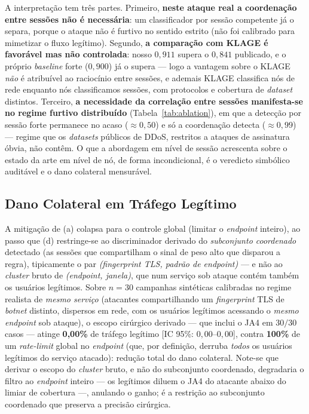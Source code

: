 \documentclass[preprint,12pt]{elsarticle}
\begin{document}
A interpretação tem três partes. Primeiro, \textbf{neste ataque real a coordenação entre sessões não é necessária}: um classificador por sessão competente já o separa, porque o ataque não é furtivo no sentido estrito (não foi calibrado para mimetizar o fluxo legítimo). Segundo, \textbf{a comparação com KLAGE é favorável mas não controlada}: nosso $0{,}911$ supera o $0{,}841$ publicado, e o próprio \emph{baseline} forte ($0{,}900$) já o supera --- logo a vantagem sobre o KLAGE \emph{não} é atribuível ao raciocínio entre sessões, e ademais KLAGE classifica nós de rede enquanto nós classificamos sessões, com protocolos e cobertura de \emph{dataset} distintos. Terceiro, \textbf{a necessidade da correlação entre sessões manifesta-se no regime furtivo distribuído} (Tabela~\ref{tab:ablation}), em que a detecção por sessão forte permanece no acaso ($\approx 0{,}50$) e só a coordenação detecta ($\approx 0{,}99$) --- regime que os \emph{datasets} públicos de DDoS, restritos a ataques de assinatura óbvia, não contêm. O que a abordagem em nível de sessão acrescenta sobre o estado da arte em nível de nó, de forma incondicional, é o veredicto simbólico auditável e o dano colateral mensurável.

\subsection{Dano Colateral em Tráfego Legítimo}

A mitigação de (a) colapsa para o controle global (limitar o \emph{endpoint} inteiro), ao passo que (d) restringe-se ao discriminador derivado do \emph{subconjunto coordenado} detectado (as sessões que compartilham o sinal de peso alto que disparou a regra), tipicamente o par \emph{(fingerprint TLS, padrão de endpoint)} --- e não ao \emph{cluster} bruto de \emph{(endpoint, janela)}, que num serviço sob ataque contém também os usuários legítimos. Sobre $n = 30$ campanhas sintéticas calibradas no regime realista de \emph{mesmo serviço} (atacantes compartilhando um \emph{fingerprint} TLS de \emph{botnet} distinto, dispersos em rede, com os usuários legítimos acessando o \emph{mesmo} \emph{endpoint} sob ataque), o escopo cirúrgico derivado --- que inclui o JA4 em $30/30$ casos --- atinge \textbf{0,00\%} de tráfego legítimo [IC 95\%: $0{,}00$--$0{,}00$], contra \textbf{100\%} de um \emph{rate-limit} global no \emph{endpoint} (que, por definição, derruba \emph{todos} os usuários legítimos do serviço atacado): redução total do dano colateral. Note-se que derivar o escopo do \emph{cluster} bruto, e não do subconjunto coordenado, degradaria o filtro ao \emph{endpoint} inteiro --- os legítimos diluem o JA4 do atacante abaixo do limiar de cobertura ---, anulando o ganho; é a restrição ao subconjunto coordenado que preserva a precisão cirúrgica.
\end{document}
